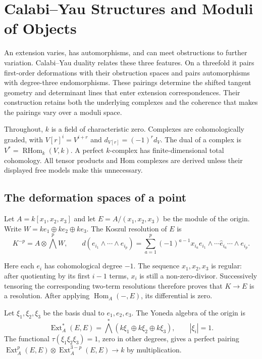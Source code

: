 \chapter{Calabi--Yau Structures and Moduli of Objects}
\label{cygeom:chap:moduli}

An extension varies, has automorphisms, and can meet obstructions to further
variation. Calabi--Yau duality relates these three features. On a threefold it
pairs first-order deformations with their obstruction spaces and pairs
automorphisms with degree-three endomorphisms. These pairings determine the
shifted tangent geometry and determinant lines that enter extension
correspondences. Their construction retains both the underlying complexes
and the coherence that makes the pairings vary over a moduli space.

Throughout, $k$ is a field of characteristic zero. Complexes are
cohomologically graded, with $V[r]^i=V^{i+r}$ and
$d_{V[r]}=(-1)^r d_V$. The dual of a complex is
$V^*=\operatorname{RHom}_k(V,k)$. A perfect $k$-complex has finite-dimensional
total cohomology. All tensor products and Hom complexes are derived unless
their displayed free models make this unnecessary.

\section{The deformation spaces of a point}
\label{cygeom:sec:point}

Let $A=k[x_1,x_2,x_3]$ and let $E=A/(x_1,x_2,x_3)$ be the module of the
origin. Write $W=k e_1\oplus k e_2\oplus k e_3$. The Koszul resolution of
$E$ is
\begin{equation}\label{cygeom:eq:koszul}
 K^{-p}=A\otimes\bigwedge^p W,\qquad
 d(e_{i_1}\wedge\cdots\wedge e_{i_p})
 =\sum_{a=1}^p(-1)^{a-1}x_{i_a}
 e_{i_1}\wedge\cdots\widehat e_{i_a}\cdots\wedge e_{i_p}.
\end{equation}

Here each $e_i$ has cohomological degree $-1$. The sequence
$x_1,x_2,x_3$ is regular: after quotienting by its first $i-1$ terms,
$x_i$ is still a non-zero-divisor. Successively tensoring the corresponding
two-term resolutions therefore proves that $K\to E$ is a resolution.
After applying $\operatorname{Hom}_A(-,E)$, its differential is zero.

\begin{proposition}\label{cygeom:prop:point-ext}
Let $\xi_1,\xi_2,\xi_3$ be the basis dual to $e_1,e_2,e_3$.
The Yoneda algebra of the origin is
\[
 \operatorname{Ext}^*_A(E,E)
   =\bigwedge^*(k\xi_1\oplus k\xi_2\oplus k\xi_3),
 \qquad |\xi_i|=1.
\]
The functional $\tau(\xi_1\xi_2\xi_3)=1$, zero in other degrees,
gives a perfect pairing
$\operatorname{Ext}^p_A(E,E)\otimes
 \operatorname{Ext}^{3-p}_A(E,E)\to k$ by multiplication.
\end{proposition}

